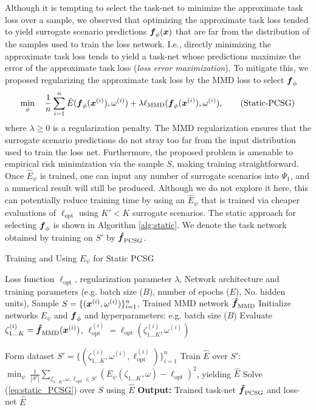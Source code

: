 Although it is tempting to select the task-net to minimize the approximate task loss over a sample, we observed that optimizing the approximate task loss tended to yield surrogate scenario predictions $\boldsymbol{f}_{\phi}(\boldsymbol{x})$ that are far from the distribution of the samples used to train the loss network. I.e., directly minimizing the approximate task loss tends to yield a task-net whose predictions maximize the error of the approximate task loss (\textit{loss error maximization}). To mitigate this, we proposed regularizing the approximate task loss by the MMD loss to select $\boldsymbol{f}_{\phi}$
\begin{equation}\label{eq:static_PCSG}
 \min_{\phi} \quad \frac{1}{n} \sum_{i=1}^{n} \hat{E}(\boldsymbol{f}_{\phi}(\boldsymbol{x}^{(i)}), \omega^{(i)}) + \lambda \ell_{\text{MMD}}(\boldsymbol{f}_{\phi}(\boldsymbol{x}^{(i)}), \omega^{(i)}), \tag{Static-PCSG}
\end{equation}
where $\lambda \geq 0$ is a regularization penalty. The MMD regularization ensures that the surrogate scenario predictions do not stray too far from the input distribution used to train the loss net. Furthermore, the proposed problem is amenable to empirical risk minimization via the sample $S$, making training straightforward. Once $\hat{E}_{\psi}$ is trained, one can input any number of surrogate scenarios into $\Psi_1$, and a numerical result will still be produced. Although we do not explore it here, this can potentially reduce training time by using an $\hat{E}_{\psi}$ that is trained via cheaper evaluations of $\ell_{\text{opt}}$ using $K' < K$ surrogate scenarios. The static approach for selecting $\boldsymbol{f}_{\phi}$ is shown in Algorithm \ref{alg:static}. We denote the task network obtained by training on $S'$ by $\boldsymbol{\hat{f}}_{\text{PCSG}}$.

\begin{algorithm}[h] 
  \small
  \caption{Training and Using $E_{\psi}$ for Static PCSG}
  \begin{algorithmic}[1]
  \Require Loss function $\ell_{\text{opt}}$, regularization parameter $\lambda$, 
  Network architecture and training parameters (e.g. batch size ($B$), number of epochs ($E$), No. hidden units), Sample $S = \{(\boldsymbol{x}^{(i)}, \omega^{(i)})\}_{i=1}^n$, Trained MMD network $\boldsymbol{\hat{f}}_{\text{MMD}}$
    \State Initialize networks $E_{\psi}$ and $\boldsymbol{f}_{\phi}$ and hyperparameters: e.g. batch size ($B$)
      \State Evaluate $\zeta_{1 \hdots K}^{(i)} = \boldsymbol{\hat{f}}_{\text{MMD}}(\boldsymbol{x}^{(i)})$,  $\ell_{\text{opt}}^{(i)} = \ell_{\text{opt}}(\zeta_{1 \hdots K}^{(i)}, \omega^{(i)})$

  \EndFor
  \State Form dataset $S' = \{(\zeta_{1 \hdots K}^{(i)}, \omega^{(i)}, \ell_{\text{opt}}^{(i)})\}_{i=1}^{n}$
  \State Train $\hat{E}$ over $S'$: $\min_{\psi} \  \frac{1}{|S'|} \sum_{\zeta_{1 \hdots K}, \omega, \ell_{\text{opt}} \in S'} (E_{\psi}(\zeta_{1 \hdots K}, \omega) - \ell_{\text{opt}} )^2$, yielding $\hat{E}$
  \State Solve (\ref{eq:static_PCSG}) over $S$ using $\hat{E}$
  \State \textbf{Output:} Trained task-net $\boldsymbol{\hat{f}}_{\text{PCSG}}$ and loss-net $\hat{E}$ 
  \end{algorithmic}\label{alg:static}
  \end{algorithm}



